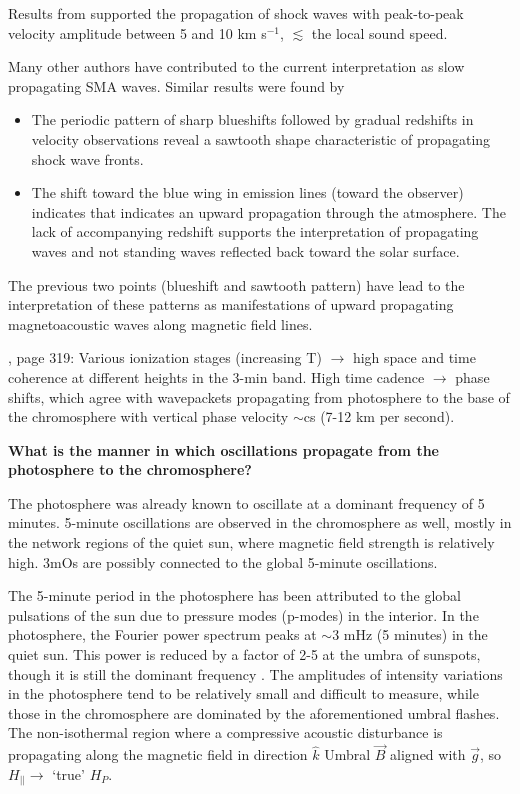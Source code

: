 Results from \cite{Tian2014} supported the propagation of shock waves with peak-to-peak
velocity amplitude between 5 and 10 km s$^{-1}$,
$\lesssim$ the local sound speed.

Many other authors have contributed to the
current interpretation as slow propagating SMA waves.
Similar results were found by
\cite{
    Brynildsen1999b,
    Brynildsen2002,
    Brynildsen2004,
    Maltby1999,
    OShea2002,
    DeMoortel2000,
    Reznikova2012
}


\begin{itemize}
    \item The periodic pattern of
        sharp blueshifts followed by gradual redshifts
        in velocity observations reveal a
        sawtooth shape characteristic of propagating shock wave fronts.
    \item The shift toward the blue wing in emission lines (toward the
        observer) indicates that indicates an upward propagation through the
        atmosphere. The lack of accompanying redshift supports the
        interpretation of propagating waves and not standing waves reflected
        back toward the solar surface.
\end{itemize}

The previous two points (blueshift and sawtooth pattern)
have lead to
the interpretation of these patterns as manifestations of upward
propagating magnetoacoustic waves along magnetic field lines.



\cite{Bogdan2006}, page 319:
Various ionization stages (increasing T) $\rightarrow$ high space and time
coherence at different heights in the 3-min band.
High time cadence
$\rightarrow$ phase shifts, which agree with wavepackets propagating from
photosphere to the base of the chromosphere with vertical phase velocity
$\sim$cs (7-12 km per second).



\textbf{What is the manner in which oscillations propagate from the photosphere to
the chromosphere?}

The photosphere was already known to oscillate at a dominant frequency of 5
minutes.
5-minute oscillations are observed in the chromosphere as well, mostly in
the network regions of the quiet sun, where magnetic field strength is
relatively high.
3mOs are possibly connected to the global 5-minute oscillations.

The 5-minute period in the photosphere has been
attributed to the global pulsations of the sun due to pressure modes
(p-modes) in the interior. In the photosphere, the Fourier power spectrum
peaks at $\sim$3 mHz (5 minutes) in the quiet sun.
This power is reduced by a
factor of 2-5 at the umbra of sunspots, though it is still the dominant
frequency \citep{Felipe2010; Bogdan2006 p. 323}.
The amplitudes of intensity variations in the photosphere tend to be relatively
small and difficult to measure, while those in the chromosphere are
dominated by the aforementioned umbral flashes.
The non-isothermal region where a compressive acoustic disturbance is
propagating along the magnetic field in
direction $\hat{k}$
Umbral $\vec{B}$ aligned with $\vec{g}$, so $H_{||} \rightarrow$
`true' $H_{P}$.


